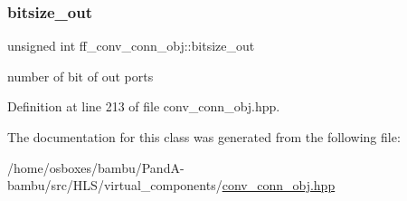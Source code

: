 \mbox{\label{classff__conv__conn__obj_adcaa8fdca2353d018666d957de41768d}} 
\subsubsection{\texorpdfstring{bitsize\+\_\+out}{bitsize\_out}}
{\footnotesize\ttfamily unsigned int ff\+\_\+conv\+\_\+conn\+\_\+obj\+::bitsize\+\_\+out\hspace{0.3cm}{\ttfamily [private]}}



number of bit of out ports 



Definition at line 213 of file conv\+\_\+conn\+\_\+obj.\+hpp.



The documentation for this class was generated from the following file\+:\begin{DoxyCompactItemize}
\item 
/home/osboxes/bambu/\+Pand\+A-\/bambu/src/\+H\+L\+S/virtual\+\_\+components/\hyperlink{conv__conn__obj_8hpp}{conv\+\_\+conn\+\_\+obj.\+hpp}\end{DoxyCompactItemize}
